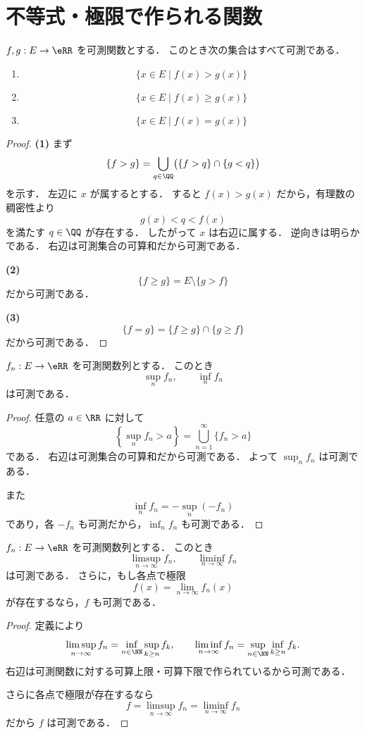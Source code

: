 \section{不等式・極限で作られる関数}

\begin{proposition}[比較からできる集合]
$f,g:E\to\eRR$ を可測関数とする．
このとき次の集合はすべて可測である．
\begin{enumerate}
    \item
    \[
    \{x\in E \mid f(x)>g(x)\}
    \]
    \item
    \[
    \{x\in E \mid f(x)\ge g(x)\}
    \]
    \item
    \[
    \{x\in E \mid f(x)=g(x)\}
    \]
\end{enumerate}
\end{proposition}
\begin{proof}
\textbf{(1)}\quad
まず
\[
\{f>g\}
=
\bigcup_{q\in\QQ}\bigl(\{f>q\}\cap\{g<q\}\bigr)
\]
を示す．
左辺に $x$ が属するとする．
すると $f(x)>g(x)$ だから，有理数の稠密性より
\[
g(x)<q<f(x)
\]
を満たす $q\in\QQ$ が存在する．
したがって $x$ は右辺に属する．
逆向きは明らかである．
右辺は可測集合の可算和だから可測である．

\textbf{(2)}\quad
\[
\{f\ge g\}=E\setminus\{g>f\}
\]
だから可測である．

\textbf{(3)}\quad
\[
\{f=g\}=\{f\ge g\}\cap\{g\ge f\}
\]
だから可測である．
\end{proof}

\begin{proposition}[可算個の上限と下限]
$f_n:E\to\eRR$ を可測関数列とする．
このとき
\[
\sup_{n}f_n,\qquad \inf_{n}f_n
\]
は可測である．
\end{proposition}
\begin{proof}
任意の $a\in\RR$ に対して
\[
\left\{\sup_n f_n>a\right\}
=
\bigcup_{n=1}^{\infty}\{f_n>a\}
\]
である．
右辺は可測集合の可算和だから可測である．
よって $\sup_n f_n$ は可測である．

また
\[
\inf_n f_n=-\sup_n(-f_n)
\]
であり，各 $-f_n$ も可測だから，$\inf_n f_n$ も可測である．
\end{proof}

\begin{proposition}
$f_n:E\to\eRR$ を可測関数列とする．
このとき
\[
\limsup_{n\to\infty}f_n,\qquad
\liminf_{n\to\infty}f_n
\]
は可測である．
さらに，もし各点で極限
\[
f(x)=\lim_{n\to\infty}f_n(x)
\]
が存在するなら，$f$ も可測である．
\end{proposition}
\begin{proof}
定義により
\[
\limsup_{n\to\infty}f_n
=
\inf_{n\in\NN}\sup_{k\ge n}f_k,
\qquad
\liminf_{n\to\infty}f_n
=
\sup_{n\in\NN}\inf_{k\ge n}f_k.
\]
右辺は可測関数に対する可算上限・可算下限で作られているから可測である．

さらに各点で極限が存在するなら
\[
f=\limsup_{n\to\infty}f_n=\liminf_{n\to\infty}f_n
\]
だから $f$ は可測である．
\end{proof}

